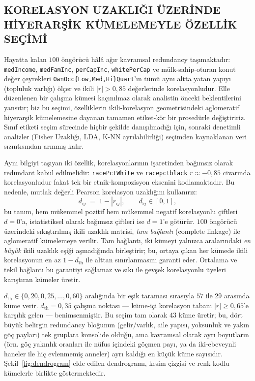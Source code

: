 \documentclass{ieeeaccess}
\begin{document}
\subsection{KORELASYON UZAKLIĞI ÜZERİNDE HİYERARŞİK KÜMELEMEYLE ÖZELLİK SEÇİMİ}
\label{ssec:fselect}
Hayatta kalan $100$ öngörücü hâlâ ağır kavramsal redundancy taşımaktadır: \texttt{medIncome}, \texttt{medFamInc}, \texttt{perCapInc}, \texttt{whitePerCap} ve mülk-sahip-oturan konut değer çeyrekleri \texttt{OwnOcc\{Low,Med,Hi\}Quart}'ın tümü aynı altta yatan yapıyı (topluluk varlığı) ölçer ve ikili $|r| > 0{,}85$ değerlerinde korelasyonludur. Elle düzenlenen bir çalışma kümesi kaçınılmaz olarak analistin önceki beklentilerini yansıtır; biz bu seçimi, özelliklerin ikili-korelasyon geometrisindeki aglomeratif hiyerarşik kümelemesine \cite{hastie} dayanan tamamen etiket-kör bir prosedürle değiştiririz. Sınıf etiketi seçim sürecinde hiçbir şekilde danışılmadığı için, sonraki denetimli analizler (Fisher Uzaklığı, LDA, K-NN ayrılabilirliği) seçimden kaynaklanan veri sızıntısından arınmış kalır.

Aynı bilgiyi taşıyan iki özellik, korelasyonlarının işaretinden bağımsız olarak redundant kabul edilmelidir: \texttt{racePctWhite} ve \texttt{racepctblack} $r \approx -0{,}85$ civarında korelasyonludur fakat tek bir etnik-kompozisyon eksenini kodlamaktadır. Bu nedenle, mutlak değerli Pearson korelasyon uzaklığını kullanırız:
\begin{equation}
d_{ij} \;=\; 1 - |r_{ij}|, \qquad d_{ij}\in[0,1],
\label{eq:corrdist}
\end{equation}
bu tanım, hem mükemmel pozitif hem mükemmel negatif korelasyonlu çiftleri $d=0$'a, istatistiksel olarak bağımsız çiftleri ise $d=1$'e götürür. $100$ öngörücü üzerindeki sıkıştırılmış ikili uzaklık matrisi, \emph{tam bağlantı} (complete linkage) ile aglomeratif kümelemeye verilir. Tam bağlantı, iki kümeyi yalnızca aralarındaki \emph{en büyük} ikili uzaklık eşiği aşmadığında birleştirir; bu, ortaya çıkan her kümede ikili korelasyonun en az $1 - d_{\mathrm{th}}$ ile alttan sınırlanmasını garanti eder. Ortalama ve tekil bağlantı bu garantiyi sağlamaz ve sıkı ile gevşek korelasyonlu üyeleri karıştıran kümeler üretir.

$d_{\mathrm{th}}\in\{0{,}20, 0{,}25, \ldots, 0{,}60\}$ aralığında bir eşik taraması sırasıyla $57$ ile $29$ arasında küme verir. $d_{\mathrm{th}} = 0{,}35$ çalışma noktası --- küme-içi korelasyon tabanı $|r|\geq 0{,}65$'e karşılık gelen --- benimsenmiştir. Bu seçim tam olarak $43$ küme üretir; bu, dört büyük belirgin redundancy bloğunun (gelir/varlık, aile yapısı, yoksunluk ve yakın göç payları) tek gruplara konsolide olduğu, ama kavramsal olarak ayrı boyutların (örn. göç yakınlık oranları ile nüfus içindeki göçmen payı, ya da iki-ebeveynli haneler ile hiç evlenmemiş anneler) ayrı kaldığı en küçük küme sayısıdır. Şekil~\ref{fig:dendrogram} elde edilen dendrogramı, kesim çizgisi ve renk-kodlu kümelerle birlikte göstermektedir.
\end{document}
